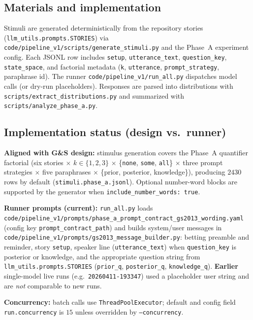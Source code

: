 \documentclass[11pt]{article}
\begin{document}
\subsection{Materials and implementation}
Stimuli are generated deterministically from the repository stories (\texttt{llm\_utils.prompts.STORIES}) via \texttt{code/pipeline\_v1/scripts/generate\_stimuli.py} and the Phase~A experiment config. Each JSONL row includes \texttt{setup}, \texttt{utterance\_text}, \texttt{question\_key}, \texttt{state\_space}, and factorial metadata (\texttt{k}, \texttt{utterance}, \texttt{prompt\_strategy}, paraphrase id). The runner \texttt{code/pipeline\_v1/run\_all.py} dispatches model calls (or dry-run placeholders). Responses are parsed into distributions with \texttt{scripts/extract\_distributions.py} and summarized with \texttt{scripts/analyze\_phase\_a.py}.

\subsection{Implementation status (design vs.\ runner)}
\label{sec:impl_status}
\textbf{Aligned with G\&S design:} stimulus generation covers the Phase~A quantifier factorial (six stories $\times$ $k\in\{1,2,3\}$ $\times$ \{\texttt{none}, \texttt{some}, \texttt{all}\} $\times$ three prompt strategies $\times$ five paraphrases $\times$ \{prior, posterior, knowledge\}), producing $2430$ rows by default (\texttt{stimuli.phase\_a.jsonl}). Optional number-word blocks are supported by the generator when \texttt{include\_number\_words: true}.

\textbf{Runner prompts (current):} \texttt{run\_all.py} loads \texttt{code/pipeline\_v1/prompts/phase\_a\_prompt\_contract\_gs2013\_wording.yaml} (config key \texttt{prompt\_contract\_path}) and builds system/user messages in \texttt{code/pipeline\_v1/prompts/gs2013\_message\_builder.py}: betting preamble and reminder, story \texttt{setup}, speaker line (\texttt{utterance\_text}) when \texttt{question\_key} is posterior or knowledge, and the appropriate question string from \texttt{llm\_utils.prompts.STORIES} (\texttt{prior\_q}, \texttt{posterior\_q}, \texttt{knowledge\_q}). \textbf{Earlier} single-model live runs (e.g.\ \texttt{20260411-193347}) used a placeholder user string and are \emph{not} comparable to new runs.

\textbf{Concurrency:} batch calls use \texttt{ThreadPoolExecutor}; default and config field \texttt{run.concurrency} is $15$ unless overridden by \texttt{--concurrency}.
\end{document}
